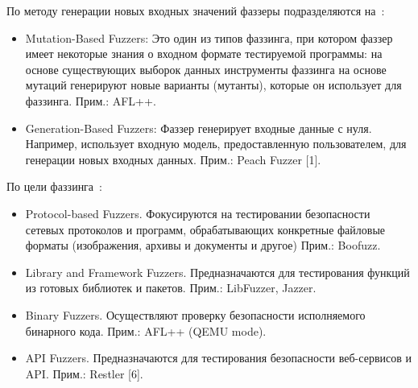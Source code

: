 По методу генерации новых входных значений фаззеры подразделяются на~\cite{???}:
\begin{itemize}
	\item Mutation-Based Fuzzers: Это один из типов фаззинга, при котором фаззер имеет некоторые знания о входном формате тестируемой программы: на основе существующих выборок данных инструменты фаззинга на основе мутаций генерируют новые варианты (мутанты), которые он использует для фаззинга. Прим.: AFL++.
	\item Generation-Based Fuzzers: Фаззер генерирует входные данные с нуля. Например, использует входную модель, предоставленную пользователем, для генерации новых входных данных. Прим.: Peach Fuzzer [1].
\end{itemize}

По цели фаззинга~\cite{???}:
\begin{itemize}
	\item Protocol-based Fuzzers. Фокусируются на тестировании безопасности сетевых протоколов и программ, обрабатывающих конкретные файловые форматы (изображения, архивы и документы и другое) Прим.: Boofuzz.
	\item Library and Framework Fuzzers. Предназначаются для тестирования функций из готовых библиотек и пакетов. Прим.: LibFuzzer, Jazzer.
	\item Binary Fuzzers. Осуществляют проверку безопасности исполняемого бинарного кода. Прим.: AFL++ (QEMU mode).
	\item API Fuzzers. Предназначаются для тестирования безопасности веб-сервисов и API. Прим.: Restler [6]. 
\end{itemize}




